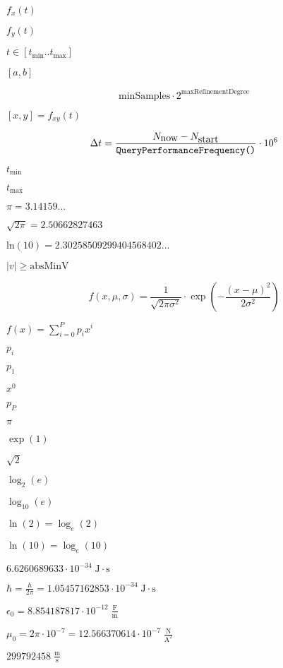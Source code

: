 \documentclass{article}
\begin{document}
$ f_x(t) $
\pagebreak

$ f_y(t) $
\pagebreak

$ t\in\left[t_\text{min}..t_\text{max}\right] $
\pagebreak

$ [a, b] $
\pagebreak

\[ \mbox{minSamples} \cdot 2^{\mbox{maxRefinementDegree}} \]
\pagebreak

$ [x,y]=f_{xy}(t) $
\pagebreak

\[ \Delta t=\frac{N_{\mbox{now}}-N_{\mbox{start}}}{\mbox{\texttt{QueryPerformanceFrequency()}}}\cdot 10^{6} \]
\pagebreak

$ t_\text{min} $
\pagebreak

$ t_\text{max} $
\pagebreak

$ \pi=3.14159... $
\pagebreak

$ \sqrt{2\pi}=2.50662827463 $
\pagebreak

$ \mbox{ln}(10)=2.30258509299404568402... $
\pagebreak

$ |v|\geq \mbox{absMinV} $
\pagebreak

\[ f(x,\mu, \sigma)=\frac{1}{\sqrt{2\pi\sigma^2}}\cdot\exp\left(-\frac{(x-\mu)^2}{2\sigma^2}\right) \]
\pagebreak

$ f(x)=\sum\limits_{i=0}^Pp_ix^i $
\pagebreak

$ p_i $
\pagebreak

$ p_1 $
\pagebreak

$ x^0 $
\pagebreak

$ p_P $
\pagebreak

$ \pi $
\pagebreak

$ \exp(1) $
\pagebreak

$ \sqrt{2} $
\pagebreak

$ \log_2(e) $
\pagebreak

$ \log_{10}(e) $
\pagebreak

$ \ln(2)=\log_{e}(2) $
\pagebreak

$ \ln(10)=\log_{e}(10) $
\pagebreak

$ 6.6260689633\cdot 10^{-34}\;\mathrm{J\cdot s} $
\pagebreak

$ \hbar=\frac{h}{2\pi}= 1.05457162853\cdot 10^{-34}\;\mathrm{J\cdot s} $
\pagebreak

$ \epsilon_0= 8.854187817\cdot 10^{-12}\;\mathrm{\frac{F}{m}} $
\pagebreak

$ \mu_0=2\pi\cdot 10^{-7}= 12.566370614\cdot 10^{-7}\;\mathrm{\frac{N}{A^2}} $
\pagebreak

$ 299792458\;\mathrm{\frac{m}{s}} $
\pagebreak
\end{document}
